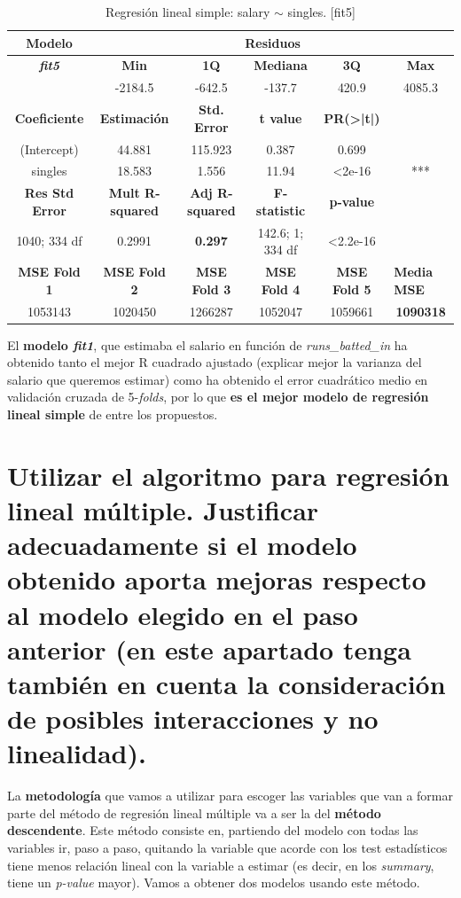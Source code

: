\documentclass[a4paper,12pt, oneside]{book}
\begin{document}
\begin{table}[H]
\footnotesize
\centering
\begin{tabular}{cccccc}
\hline
\textbf{Modelo} & \multicolumn{5}{c}{\textbf{Residuos}} \\ \hline
\textit{\textbf{fit5}} & \textbf{Min} & \textbf{1Q} & \textbf{Mediana} & \textbf{3Q} & \textbf{Max} \\ \cline{2-6} 
\multicolumn{1}{l}{} & -2184.5 & -642.5 & -137.7 & 420.9 & 4085.3 \\ \cline{1-5}
\textbf{Coeficiente} & \textbf{Estimación} & \textbf{Std. Error} & \textbf{t value} & \textbf{PR(\textgreater{}|t|)} & \multicolumn{1}{l}{} \\ \cline{1-5}
(Intercept) & 44.881 & 115.923 & 0.387 & 0.699 &  \\
singles & 18.583 & 1.556 & 11.94 & \textless{}2e-16 & *** \\ \cline{1-5}
\textbf{Res Std Error} & \textbf{Mult R-squared} & \textbf{Adj R-squared} & \textbf{F-statistic} & \textbf{p-value} & \multicolumn{1}{l}{} \\ \cline{1-5}
1040; 334 df & 0.2991 & \textbf{0.297} & 142.6; 1; 334 df & \textless{}2.2e-16 & \multicolumn{1}{l}{} \\ \hline
\textbf{MSE Fold 1} & \textbf{MSE Fold 2} & \textbf{MSE Fold 3} & \textbf{MSE Fold 4} & \textbf{MSE Fold 5} & \multicolumn{1}{l}{\textbf{Media MSE}} \\ \hline
1053143 & 1020450 & 1266287 & 1052047 & 1059661 & \textbf{1090318}
\end{tabular}
\caption{Regresión lineal simple: salary $\sim$ singles. {[}fit5{]}}
\label{tab:fit5}
\end{table}

El \textbf{modelo \textit{fit1}}, que estimaba el salario en función de \textit{runs\_batted\_in} ha obtenido tanto el mejor R cuadrado ajustado (explicar mejor la varianza del salario que queremos estimar) como ha obtenido el error cuadrático medio en validación cruzada de 5-\textit{folds}, por lo que \textbf{es el mejor modelo de regresión lineal simple} de entre los propuestos.

\section[Regresión lineal múltiple]{Utilizar el algoritmo para regresión lineal múltiple. Justificar adecuadamente si el modelo obtenido aporta mejoras respecto al modelo elegido en el paso anterior (en este apartado tenga también en cuenta la consideración de posibles interacciones y no linealidad).}
La \textbf{metodología} que vamos a utilizar para escoger las variables que van a formar parte del método de regresión lineal múltiple va a ser la del \textbf{método descendente}. Este método consiste en, partiendo del modelo con todas las variables ir, paso a paso, quitando la variable que acorde con los test estadísticos tiene menos relación lineal con la variable a estimar (es decir, en los \textit{summary}, tiene un \textit{p-value} mayor). Vamos a obtener dos modelos usando este método.\\
\end{document}
